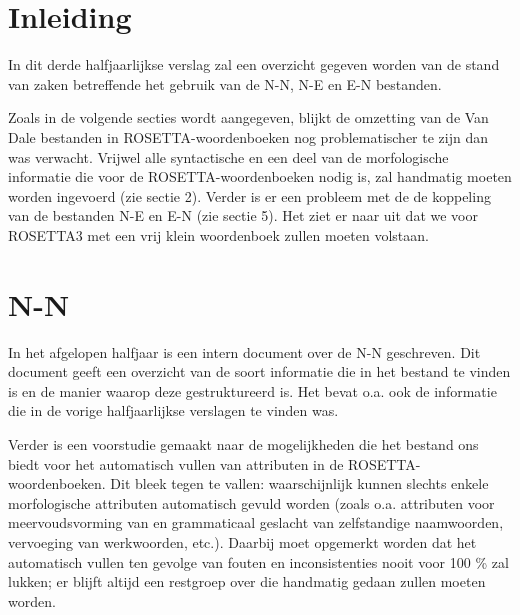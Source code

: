 
   \RosSupersedes{-}
   \MakeRosTitle
%
%

\section{Inleiding}
In dit derde halfjaarlijkse verslag zal een overzicht gegeven worden van de 
stand van zaken betreffende het gebruik van de N-N, N-E en E-N bestanden.

Zoals in de volgende secties wordt aangegeven, blijkt de omzetting van de Van 
Dale bestanden in ROSETTA-woordenboeken nog problematischer te zijn dan was 
verwacht. Vrijwel alle syntactische en een deel van de morfologische informatie 
die voor de ROSETTA-woordenboeken nodig is, zal handmatig moeten worden 
ingevoerd (zie sectie 2). Verder is er een probleem met de de koppeling van de 
bestanden N-E en E-N (zie sectie 5). Het ziet er naar uit dat we voor ROSETTA3
met een vrij klein woordenboek zullen moeten volstaan.

\section{N-N}
In het afgelopen halfjaar is een intern document over de N-N geschreven. 
Dit document geeft een overzicht van de soort informatie die in het bestand
te vinden is en de manier waarop deze gestruktureerd is. 
Het bevat o.a. ook de informatie die in de vorige halfjaarlijkse verslagen 
te vinden was.

Verder is een voorstudie gemaakt naar de mogelijkheden die het bestand ons biedt
voor het automatisch vullen van attributen in de 
RO\-SET\-TA-woor\-den\-boe\-ken. Dit bleek tegen te vallen: waarschijnlijk 
kunnen slechts enkele morfologische attributen automatisch 
gevuld worden (zoals o.a. attributen voor meervoudsvorming van 
en grammaticaal geslacht van zelfstandige naamwoorden, 
vervoeging van werkwoorden, etc.). 
Daarbij moet opgemerkt worden dat het automatisch vullen ten gevolge van fouten
en inconsistenties nooit voor 100 \% zal lukken; er blijft altijd een 
restgroep over die handmatig gedaan zullen moeten worden.


